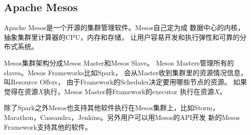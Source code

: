 \subsection{Apache Mesos}
Apache Mesos是一个开源的集群管理软件。Mesos自己定为成
数据中心的内核，抽象集群里计算器的CPU，内存和存储，
让用户容易开发和执行弹性和可靠的分布式系统。

Mesos集群架构分成Mesos Master和Mesos Slave。
Mesos Masters管理所有的slaves。Mesos Frameworks比如Spark，
会从Master收到集群里的资源情况信息，叫Resource Offers，
由于Framework的Scheduler决定要用哪些节点的资源。
如果觉得在资源$X$执行，Mesos Master将Framework的executor
执行在资源$X$。

除了Spark之外Mesos也支持其他软件执行在Mesos集群上，比如Storm，
Marathon，Cassandra，Jenkins。另外用户可以用Mesos的API开发
新的Mesos Framework支持其他的软件。



